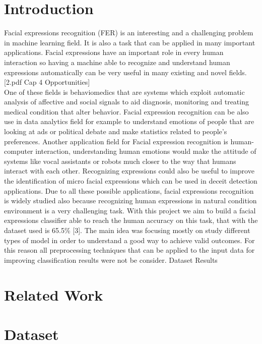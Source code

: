 \documentclass[10pt,twocolumn,letterpaper]{article}
\begin{document}
\section{Introduction}
   Facial expressions recognition (FER) is an interesting and a challenging problem 
   in machine learning field. It is also a task that can be applied in many important applications.
   Facial expressions have an important role in every human interaction so having a machine able to 
   recognize and understand human expressions automatically can be very useful
   in many existing and novel fields. [2.pdf Cap 4 Opportunities]
   \\One of these fields is behaviomedics that are systems which exploit automatic analysis of affective and social signals 
   to aid diagnosis, monitoring and treating medical condition that alter behavior.
   Facial expression recognition can be also use in data analytics field for example to understand 
   emotions of people that are looking at ads or political debate and make statistics related to people's preferences. 
   Another application field for Facial expression recognition is human-computer interaction, understanding human emotions 
   would make the attitude of systems like vocal assistants or robots much closer to the way that humans interact with each other.
   Recognizing expressions could also be useful to improve the identification of micro facial expressions which can be used in 
   deceit detection applications.
   Due to all these possible applications, facial expressions recognition is widely studied also because recognizing 
   human expressions in natural condition environment is a very challenging task.
   With this project we aim to build a facial expressions classifier able to reach the human accuracy on this task, 
   that with the dataset used is 65.5\% [3]. 
   The main idea was focusing mostly on study different types of model in order to understand a good way to achieve valid outcomes.
   For this reason all preprocessing techniques that can be applied to the input data for improving classification results were not be consider.
   Dataset
   Results 




\section{Related Work}
\section{Dataset}
\end{document}
